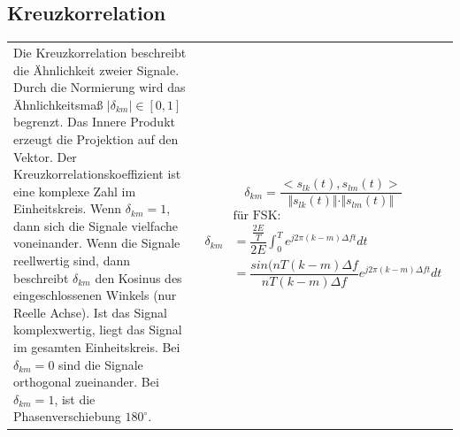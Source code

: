 \subsection{Kreuzkorrelation}
\begin{tabular}{ll}
 \addtolength{\jot}{2mm}
 \parbox{7.5cm}{Die Kreuzkorrelation beschreibt die Ähnlichkeit zweier Signale. Durch die Normierung wird das Ähnlichkeitsmaß $\vert \delta_{km} \vert \in [0,1]$ begrenzt. Das Innere Produkt erzeugt die Projektion auf den Vektor. Der Kreuzkorrelationskoeffizient ist eine komplexe Zahl im Einheitskreis. Wenn $\delta_{km} = 1$, dann sich die Signale vielfache voneinander. Wenn die Signale reellwertig sind, dann beschreibt $\delta_{km}$ den Kosinus des eingeschlossenen Winkels (nur Reelle Achse). Ist das Signal komplexwertig, liegt das Signal im gesamten Einheitskreis. Bei $\delta_{km} = 0$ sind die Signale orthogonal zueinander. Bei $\delta_{km} = 1$, ist die Phasenverschiebung $180^{\circ}$.
}&
 \parbox{4cm}{
  \addtolength{\jot}{2mm}
 \begin{equation*}
\delta_{km} = \frac{< s_{lk}(t) , s_{lm}(t) >}{\Vert s_{lk}(t) \Vert \cdot \Vert s_{lm}(t) \Vert}
 \end{equation*}
 \begin{eqnarray*}
 &\text{für FSK:} \\
\delta_{km} &= \dfrac{\frac{2E}{T}}{2E} \int^T_0 e^{j2 \pi (k-m) \Delta ft} dt \\
&= \dfrac{sin(nT(k-m)\Delta f}{nT(k-m)\Delta f} e^{j2 \pi (k-m) \Delta ft} dt
 \end{eqnarray*}
 }
\end{tabular}\\~
